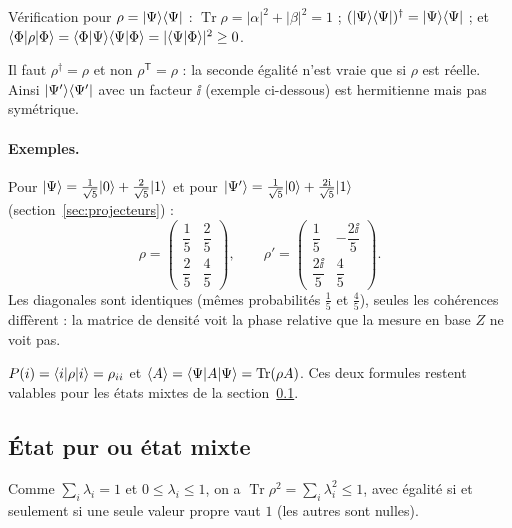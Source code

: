 Vérification pour $\rho=|\Psi\rangle\langle \Psi|$ :
$\operatorname{Tr}\rho=|\alpha|^2+|\beta|^2=1$ ; $(|\Psi\rangle\langle \Psi|)^\dagger
=|\Psi\rangle\langle \Psi|$ ; et $\langle \Phi|\rho|\Phi\rangle=\langle \Phi|\Psi\rangle\langle \Psi|\Phi\rangle
=|\langle \Psi|\Phi\rangle|^2\geq0$.

\begin{remarque}
Il faut $\rho^\dagger=\rho$ et non $\rho^{\mathsf T}=\rho$ : la seconde égalité n'est vraie
que si $\rho$ est réelle. Ainsi $|\Psi'\rangle\langle \Psi'|$ avec un facteur $\ii$ (exemple
ci-dessous) est hermitienne mais pas symétrique.
\end{remarque}

\paragraph{Exemples.} Pour $|\Psi\rangle=\frac{1}{\sqrt5}|0\rangle+\frac{2}{\sqrt5}|1\rangle$ et
pour $|\Psi'\rangle=\frac{1}{\sqrt5}|0\rangle+\frac{2\mathrm{i}}{\sqrt5}|1\rangle$
(section~\ref{sec:projecteurs}) :
\[
  \rho=\begin{pmatrix}\dfrac15 & \dfrac25\\[0.6ex] \dfrac25 & \dfrac45\end{pmatrix},
  \qquad
  \rho'=\begin{pmatrix}\dfrac15 & -\dfrac{2\ii}{5}\\[0.6ex] \dfrac{2\ii}{5} & \dfrac45\end{pmatrix}.
\]
Les diagonales sont identiques (mêmes probabilités $\frac15$ et $\frac45$), seules les
cohérences diffèrent : la matrice de densité voit la phase relative que la mesure en
base $Z$ ne voit pas.

\begin{remarque}
$P(i)=\langle i|\rho|i\rangle=\rho_{ii}$ et $\langle A\rangle=\langle \Psi|A|\Psi\rangle
=\operatorname{Tr}(\rho A)$. Ces deux formules restent valables pour les états mixtes
de la section~\ref{sec:pur-mixte}.
\end{remarque}

\subsection{État pur ou état mixte}\label{sec:pur-mixte}

Comme $\sum_i\lambda_i=1$ et $0\leq\lambda_i\leq1$, on a
$\operatorname{Tr}\rho^2=\sum_i\lambda_i^2\leq1$, avec égalité si et seulement si une
seule valeur propre vaut $1$ (les autres sont nulles).

